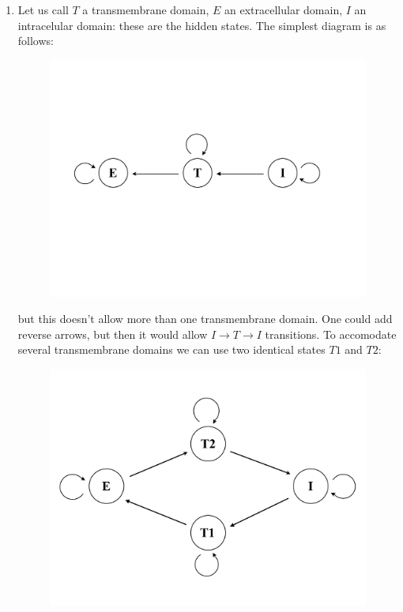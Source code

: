 \documentclass[a4paper,11pt]{article}
\begin{document}
\begin{enumerate}

\item Let us call $T$ a transmembrane domain, $E$ an extracellular
  domain, $I$ an intracelular domain: these are the hidden states.
The simplest diagram is as follows:
\begin{figure}[h]
\center\includegraphics[scale=.4]{hmm_graph1.pdf}
\end{figure}

but this doesn't allow more than one transmembrane domain.
One could add reverse arrows, but then it would allow $I\rightarrow T \rightarrow I$ transitions.
To accomodate several transmembrane domains we can 
use two identical states $T1$ and $T2$: 
\begin{figure}[hbt]
\center\includegraphics[scale=.4]{hmm_graph2.pdf}
\end{figure}


\end{enumerate}
\end{document}
